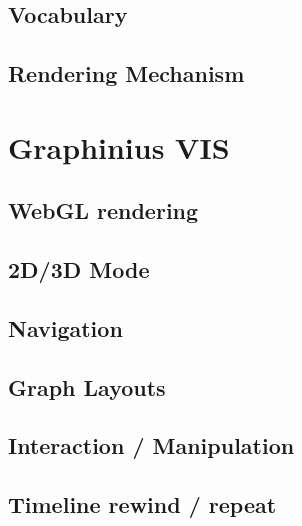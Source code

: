 	\subsection{Vocabulary}
	\label{ssect:vocabulary}	

	\subsection{Rendering Mechanism}
	\label{ssect:rendering}


\section{Graphinius VIS}
\label{sect:graphinius_vis}

	\subsection{WebGL rendering}
	\label{ssect:webgl_rendering}	

	\subsection{2D/3D Mode}
	\label{ssect:vis_2d3d}
	
	\subsection{Navigation}
	\label{ssect:vis_navigation}
	
	\subsection{Graph Layouts}
	\label{ssect:vis_layouts}	
	
	\subsection{Interaction / Manipulation}
	\label{ssect:vis_interact_manipulate}
	
	\subsection{Timeline rewind / repeat}
	\label{ssect:vis_timeline}	
	
